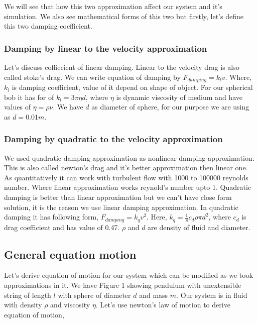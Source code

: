 \documentclass[11pt,a4paper]{article}
\begin{document}
We will see that how this two approximation affect our system and it's simulation. We also see mathematical forms of this two but firstly, let's define this two damping coefficient.

\subsubsection{Damping by linear to the velocity approximation}
\label{sec:orge02b8e2}

Let's discuss coffiecient of linear damping. Linear to the velocity drag is also called stoke's drag. We can write equation of damping by \(F_{damping} = k_{l}v\). Where, \(k_{l}\) is damping coefficient, value of it depend on shape of object. For our spherical bob it has for of \(k_{l} = 3\pi\eta d\), where \(\eta\) is dynamic viscosity of medium and have values of \(\eta = \rho \nu\). We have \(d\) as diameter of sphere, for our purpose we are using as \(d=0.01m\). 

\subsubsection{Damping by quadratic to the velocity approximation}
\label{sec:org20da46a}

We used quadratic damping approximation as nonlinear damping approximation. This is also called newton's drag and it's better approximation then linear one. As quantitatively it can work with turbulent flow with 1000 to 100000 reynolds number. Where linear approximation works reynold's number upto 1. Quadratic damping is better than linear approximation but we can't have close form solution, it is the reason we use linear damping approximation. In quadratic damping it has following form, \(F_{damping} = k_{q} v^{2}\). Here, \(k_{q} = \frac{1}{8}c_{d}\rho \pi d^{2}\), where \(c_{d}\) is drag coefficient and has value of 0.47. \(\rho\) and \(d\) are density of fluid and diameter.\cite{lubarda2021analysis}\cite{goossens2019review}


\subsection{General equation motion}
\label{sec:org9a3bc1f}

Let's derive equation of motion for our system which can be modified as we took approximations in it. We have Figure 1 showing pendulum with unextensible string of length \(l\) with sphere of diameter \(d\) and mass \(m\). Our system is in fluid with density \(\rho\) and viscosity \(\eta\). Let's use newton's law of motion to derive equation of motion,
\end{document}
